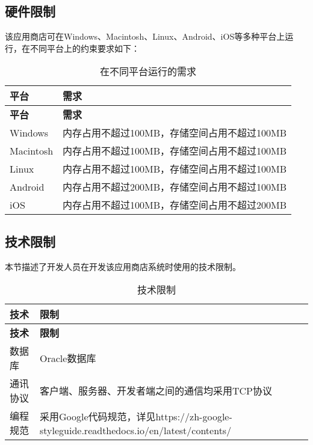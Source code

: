 \subsection{硬件限制}
该应用商店可在Windows、Macintosh、Linux、Android、iOS等多种平台上运行，在不同平台上的约束要求如下：\\

\begin{longtable}{|p{4cm}|p{10cm}|}
\caption{在不同平台运行的需求}\label{tab:hardware_constraints} \\
\hline
\textbf{平台} & \textbf{需求}     \\
\hline
\endfirsthead
\hline
\textbf{平台} & \textbf{需求}    \\
\hline
\endhead
\hline 
\endfoot
\hline
\endlastfoot
Windows & 内存占用不超过100MB，存储空间占用不超过100MB \\
Macintosh & 内存占用不超过100MB，存储空间占用不超过100MB \\
Linux & 内存占用不超过100MB，存储空间占用不超过100MB \\
Android & 内存占用不超过200MB，存储空间占用不超过100MB\\
iOS & 内存占用不超过100MB，存储空间占用不超过200MB\\
\end{longtable}

\subsection{技术限制}
本节描述了开发人员在开发该应用商店系统时使用的技术限制。\\
\begin{longtable}{|p{4cm}|p{10cm}|}
\caption{技术限制}\label{tab:technical_constraints} \\
\hline
\textbf{技术} & \textbf{限制} \\
\hline
\endfirsthead
\hline
\textbf{技术} & \textbf{限制} \\
\hline
\endhead
\hline 
\endfoot
\hline
\endlastfoot
数据库 & Oracle数据库\\
通讯协议 & 客户端、服务器、开发者端之间的通信均采用TCP协议\\
编程规范 & 采用Google代码规范，详见https://zh-google-styleguide.readthedocs.io/en/latest/contents/\\
\hline
\end{longtable}